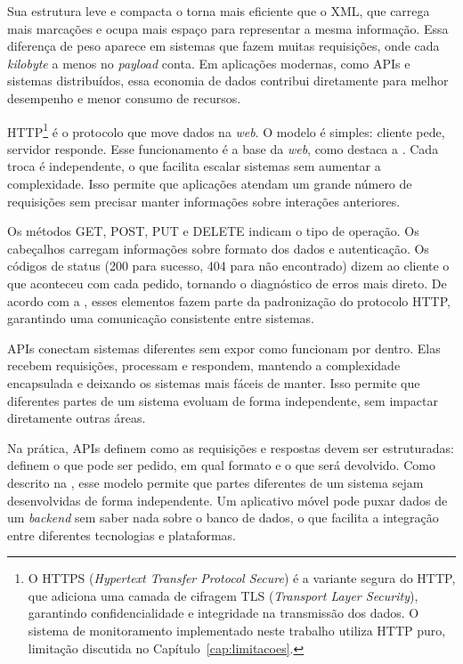 \documentclass[
    12pt
    ,oneside
    ,a4paper
    ,chapter=TITLE
    ,section=TITLE
    ,sumario=abnt-6027-2012]{abntex2}
\begin{document}
Sua estrutura leve e compacta o torna mais eficiente que o XML, que carrega mais marcações e ocupa mais espaço para representar a mesma informação. Essa diferença de peso aparece em sistemas que fazem muitas requisições, onde cada \textit{kilobyte} a menos no \textit{payload} conta. Em aplicações modernas, como APIs e sistemas distribuídos, essa economia de dados contribui diretamente para melhor desempenho e menor consumo de recursos.

HTTP\footnote{O HTTPS (\textit{Hypertext Transfer Protocol Secure}) é a variante segura do HTTP, que adiciona uma camada de cifragem TLS (\textit{Transport Layer Security}), garantindo confidencialidade e integridade na transmissão dos dados. O sistema de monitoramento implementado neste trabalho utiliza HTTP puro, limitação discutida no Capítulo~\ref{cap:limitacoes}.} é o protocolo que move dados na \textit{web}. O modelo é simples: cliente pede, servidor responde. Esse funcionamento é a base da \textit{web}, como destaca a . Cada troca é independente, o que facilita escalar sistemas sem aumentar a complexidade. Isso permite que aplicações atendam um grande número de requisições sem precisar manter informações sobre interações anteriores.

Os métodos GET, POST, PUT e DELETE indicam o tipo de operação. Os cabeçalhos carregam informações sobre formato dos dados e autenticação. Os códigos de status (200 para sucesso, 404 para não encontrado) dizem ao cliente o que aconteceu com cada pedido, tornando o diagnóstico de erros mais direto. De acordo com a , esses elementos fazem parte da padronização do protocolo HTTP, garantindo uma comunicação consistente entre sistemas.

APIs conectam sistemas diferentes sem expor como funcionam por dentro. Elas recebem requisições, processam e respondem, mantendo a complexidade encapsulada e deixando os sistemas mais fáceis de manter. Isso permite que diferentes partes de um sistema evoluam de forma independente, sem impactar diretamente outras áreas.

Na prática, APIs definem como as requisições e respostas devem ser estruturadas: definem o que pode ser pedido, em qual formato e o que será devolvido. Como descrito na , esse modelo permite que partes diferentes de um sistema sejam desenvolvidas de forma independente. Um aplicativo móvel pode puxar dados de um \textit{backend} sem saber nada sobre o banco de dados, o que facilita a integração entre diferentes tecnologias e plataformas.
\end{document}

